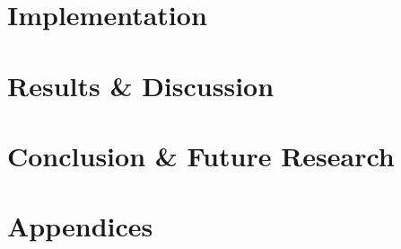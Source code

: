 \documentclass[12pt, oneside]{book}
\begin{document}
\part{Implementation}




\part{Results \& Discussion}




\part{Conclusion \& Future Research}



\appendix           %
\part*{Appendices}




 


\newpage 
\printbibliography[heading=bibintoc, title={References}]
\end{document}
